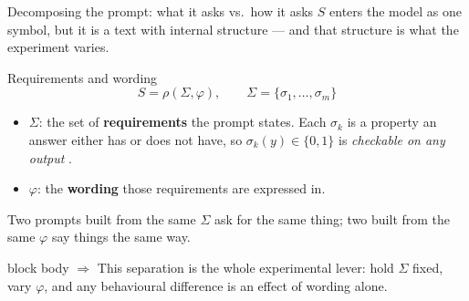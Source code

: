 \documentclass[11pt,aspectratio=169]{beamer}
\newcommand{\takeaway}[1]{%
  \vfill
  \begin{beamercolorbox}[wd=\textwidth,sep=5pt,rounded=true]{block body}%
    \small\textbf{$\Rightarrow$} #1
  \end{beamercolorbox}}
\begin{document}
\begin{frame}{Decomposing the prompt: what it asks vs.\ how it asks}
  $S$ enters the model as one symbol, but it is a text with internal
  structure --- and that structure is what the experiment varies.
  \begin{block}{Requirements and wording}
    \vspace{-0.8em}
    \begin{equation*}
      S = \rho(\Sigma,\varphi), \qquad \Sigma = \{\sigma_1,\ldots,\sigma_m\}
    \end{equation*}
  \end{block}
  \begin{itemize}
    \item $\Sigma$: the set of \textbf{requirements} the prompt states. Each
          $\sigma_k$ is a property an answer either has or does not have, so
          $\sigma_k(y)\in\{0,1\}$ is \emph{checkable on any output}
          \citep{zhou2023ifeval}.
    \item $\varphi$: the \textbf{wording} those requirements are expressed in.
  \end{itemize}
  \medskip
  Two prompts built from the same $\Sigma$ ask for the same thing; two built
  from the same $\varphi$ say things the same way.
  \takeaway{This separation is the whole experimental lever: hold $\Sigma$
  fixed, vary $\varphi$, and any behavioural difference is an effect of
  wording alone.}
\end{frame}
\end{document}
